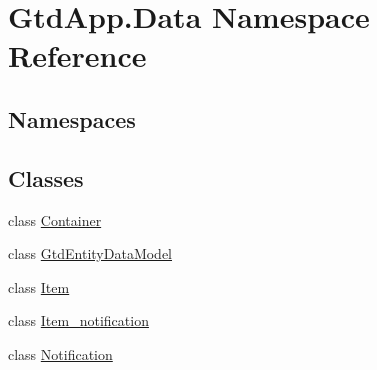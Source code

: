 \hypertarget{namespace_gtd_app_1_1_data}{}\section{Gtd\+App.\+Data Namespace Reference}
\label{namespace_gtd_app_1_1_data}
\subsection*{Namespaces}
\begin{DoxyCompactItemize}
\end{DoxyCompactItemize}
\subsection*{Classes}
\begin{DoxyCompactItemize}
\item 
class \mbox{\hyperlink{class_gtd_app_1_1_data_1_1_container}{Container}}
\item 
class \mbox{\hyperlink{class_gtd_app_1_1_data_1_1_gtd_entity_data_model}{Gtd\+Entity\+Data\+Model}}
\item 
class \mbox{\hyperlink{class_gtd_app_1_1_data_1_1_item}{Item}}
\item 
class \mbox{\hyperlink{class_gtd_app_1_1_data_1_1_item__notification}{Item\+\_\+notification}}
\item 
class \mbox{\hyperlink{class_gtd_app_1_1_data_1_1_notification}{Notification}}
\end{DoxyCompactItemize}
